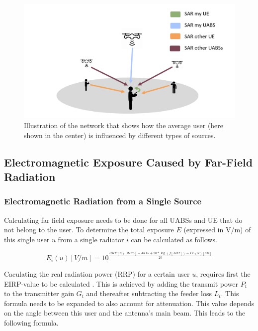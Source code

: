 \documentclass[twocolumn]{phdsymp} %
\begin{document}
\begin{figure}[h!]
\centering
  \includegraphics[width=\linewidth]{networkIllustrationSARSources.png}
  \caption{Illustration of the network that shows how the average user (here shown in the center) is influenced by different types of sources. }
  \label{fig:networkIllustration}
\end{figure}

\subsection{Electromagnetic Exposure Caused by Far-Field Radiation} %
\label{sub:Calculatingdownlinkexposure}

\subsubsection{Electromagnetic Radiation from a Single Source}
\label{sec:calculatingexposure}

Calculating far field exposure needs to be done for all UABSs and UE that do not belong to the user.
To determine the total exposure $E$ (expressed in V/m) of this single user $u$ from a single radiator $i$ can be calculated
as follows.

\begin{equation}
E_i(u) [V/m] = 10^{\frac{RRP(u)[dBm] - 43.15 + 20*\log(f [Mhz])- PL(u) [dB]}{20}}
\label{eq:singleexposure}
\end{equation}

Caculating the real radiation power (RRP) for a certain user $u$, requires first the EIRP-value to be calculated  \cite{J6_originalExposureFormula, J1}.
This is achieved by adding the transmit power $P_t$ to the transmitter gain $G_t$ and thereafter subtracting the feeder loss $L_t$.
This formula needs to be expanded to also account for attenuation. This value depends on the angle 
between this user and the antenna's main beam. This leads to the following formula.
\end{document}
